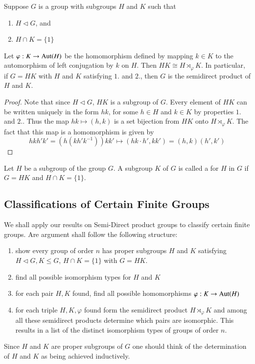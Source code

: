 \documentclass[12pt, a4paper, oneside, openright, titlepage]{book}
\begin{document}
\begin{thm}
    Suppose $G$ is a group with subgroups $H$ and $K$ such that \begin{enumerate}
        \item $H \vartriangleleft G$, and 
        \item $H\cap K = \{1\}$
    \end{enumerate}
    Let $\varphi:K\rightarrow \operatorname{Aut}(H)$ be the homomorphism defined by mapping $k \in K$ to the automorphism of left conjugation by $k$ on $H$. Then $HK \cong H\rtimes_{\varphi}K$. In particular, if $G = HK$ with $H$ and $K$ satisfying $1.$ and $2.$, then $G$ is the semidirect product of $H$ and $K$.
\end{thm}
\begin{proof}
    Note that since $H\vartriangleleft G$, $HK$ is a subgroup of $G$. Every element of $HK$ can be written uniquely in the form $hk$, for some $h \in H$ and $k \in K$ by properties $1.$ and $2.$. Thus the map $hk\mapsto (h,k)$ is a set bijection from $HK$ onto $H\rtimes_{\varphi}K$. The fact that this map is a homomorphism is given by $$hkh'k' = (h(kh'k^{-1}))kk' \mapsto (hk\cdot h',kk') = (h,k)(h',k')$$
\end{proof}

\begin{defn}
    Let $H$ be a subgroup of the group $G$. A subgroup $K$ of $G$ is called a  for $H$ in $G$ if $G = HK$ and $H\cap K = \{1\}$.
\end{defn}

\subsection{Classifications of Certain Finite Groups}

We shall apply our results on Semi-Direct product groups to classify certain finite groups. Are argument shall follow the following structure: \begin{enumerate}
    \item show every group of order $n$ has proper subgroups $H$ and $K$ satisfying $H \triangleleft G,K\leq G$, $H\cap K = \{1\}$ with $G = HK$.
    \item find all possible isomorphism types for $H$ and $K$
    \item for each pair $H,K$ found, find all possible homomorphisms $\varphi:K\rightarrow \operatorname{Aut}(H)$
    \item for each triple $H,K,\varphi$ found form the semidirect product $H \rtimes_{\varphi}K$ and among all these semidirect products determine which pairs are isomorphic. This results in a list of the distinct isomorphism types of groups of order $n$.
\end{enumerate}
Since $H$ and $K$ are proper subgroups of $G$ one should think of the determination of $H$ and $K$ as being achieved inductively.
\end{document}

